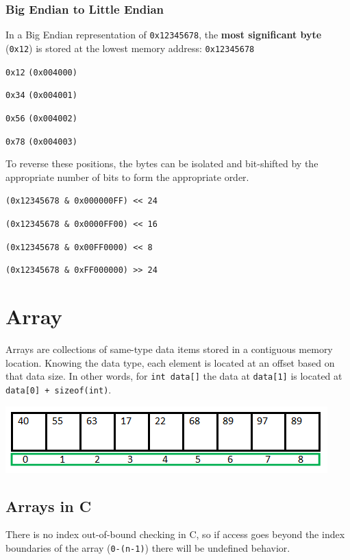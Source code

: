 \documentclass[11pt]{article}
\begin{document}
\subsubsection{Big Endian to Little Endian}

In a Big Endian representation of \texttt{0x12345678}, the \textbf{most significant byte} (\texttt{0x12}) is stored at the lowest memory address: \texttt{0x12345678}

\begin{list}{}{}
    \item \texttt{0x12} \texttt{(0x004000)}
    \item \texttt{0x34} \texttt{(0x004001)}
    \item \texttt{0x56} \texttt{(0x004002)}
    \item \texttt{0x78} \texttt{(0x004003)}
\end{list}

To reverse these positions, the bytes can be isolated and bit-shifted by the appropriate number of bits to form the appropriate order.

\begin{list}{}{}
\item \texttt{(0x12345678 \& 0x000000FF) << 24}
\item \texttt{(0x12345678 \& 0x0000FF00) << 16}
\item \texttt{(0x12345678 \& 0x00FF0000) << 8}
\item \texttt{(0x12345678 \& 0xFF000000) >> 24}
\end{list}

\section{Array}
Arrays are collections of same-type data items stored in a contiguous memory location. Knowing the data type, each element is located at an offset based on that data size. In other words, for \texttt{int data[]} the data at \texttt{data[1]} is located at \texttt{data[0] + sizeof(int)}.
\begin{center}
    \includegraphics[width=250 px]{img/array}  \\
\end{center}
\subsection{Arrays in C}
There is no index out-of-bound checking in C, so if access goes beyond the index boundaries of the array (\texttt{0-(n-1)}) there will be undefined behavior.
\end{document}

